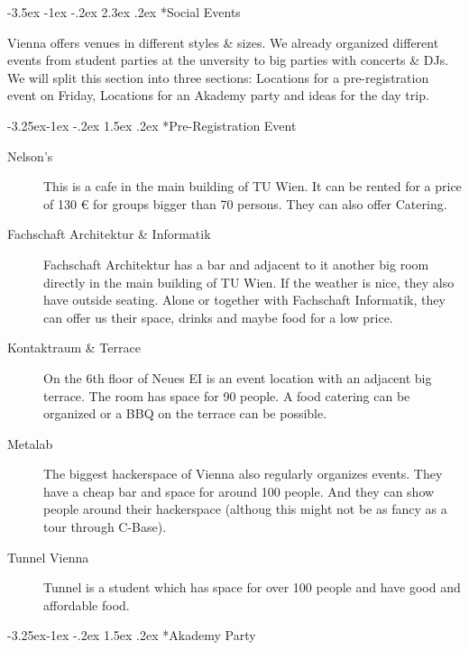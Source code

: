 \documentclass[10pt,a4paper]{article}
\makeatletter
\renewcommand\section{%
\@startsection{section}{1}{\z@}%
              {-3.5ex \@plus -1ex \@minus -.2ex}%
              {2.3ex \@plus.2ex}%
              {\color{kdelight}\sffamily\LARGE\bfseries}}
\renewcommand\subsection{%
\@startsection{subsection}{2}{\z@}%
              {-3.25ex\@plus -1ex \@minus -.2ex}%
              {1.5ex \@plus .2ex}%
              {\color{kdelight}\sffamily\Large\bfseries}}
\makeatother
\begin{document}
\newpage

\section*{Social Events}
Vienna offers venues in different styles \& sizes. We already organized different events from student parties at the unversity to big parties with concerts \& DJs.
We will split this section into three sections: Locations for a pre-registration event on Friday, Locations for an Akademy party and ideas for the day trip.


\subsection*{Pre-Registration Event}

\begin{description}
\item[\color{kdedarker} Nelson's] This is a cafe in the main building of TU Wien. It can be rented for a price of 130 \euro{} for groups bigger than 70 persons. They can also offer Catering.
\item[\color{kdedarker} Fachschaft Architektur \& Informatik] Fachschaft Architektur has a bar and adjacent to it another big room directly in the main building of TU Wien. If the weather is nice, they also have outside seating. Alone or together with Fachschaft Informatik, they can offer us their space, drinks and maybe food for a low price.
\item[\color{kdedarker} Kontaktraum \& Terrace] On the 6th floor of Neues EI is an event location with an adjacent big terrace. The room has space for 90 people. A food catering can be organized or a BBQ on the terrace can be possible.
\item[\color{kdedarker} Metalab] The biggest hackerspace of Vienna also regularly organizes events. They have a cheap bar and space for around 100 people. And they can show people around their hackerspace (althoug this might not be as fancy as a tour through C-Base).
\item[\color{kdedarker} Tunnel Vienna] Tunnel is a student which has space for over 100 people and have good and affordable food.
\end{description}

\subsection*{Akademy Party}
\end{document}
